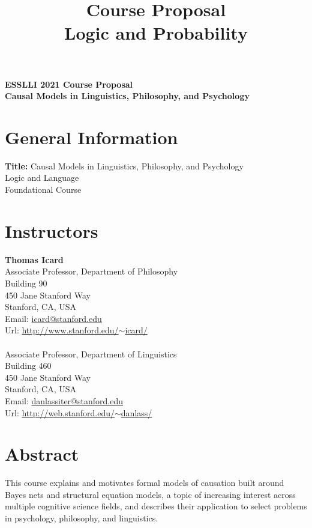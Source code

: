 \documentclass[english]{article}
\begin{document}
\title{\Large{ Course Proposal} \\ \Large{\bf Logic and Probability}}
\author{}
\date{}

\noindent \Large{\bf ESSLLI 2021 Course Proposal} \\ \large{\bf Causal Models in Linguistics, Philosophy, and Psychology} 

\section*{\large{General Information}}

\normalsize{{\bf Title:} Causal Models in Linguistics, Philosophy, and Psychology \\
 Logic and Language \\
 Foundational Course}

\section*{\large{Instructors}}

\normalsize{ {\bf Thomas Icard}\\
Associate Professor, Department of Philosophy \\
Building 90 \\
450 Jane Stanford Way \\
Stanford, CA, USA \\
Email: \href{icard@stanford.edu}{icard@stanford.edu}\\
Url: \href{http://www.stanford.edu/~icard/}{http://www.stanford.edu/$\sim$icard/} \\

\\
Associate Professor, Department of Linguistics \\
Building 460 \\
450 Jane Stanford Way \\
Stanford, CA, USA \\
Email: \href{danlassiter@stanford.edu}{danlassiter@stanford.edu}\\
Url: \href{http://web.stanford.edu/~danlass/}{http://web.stanford.edu/$\sim$danlass/}}

\section*{\large{Abstract}}

This course explains and motivates formal models of causation built around Bayes nets and structural equation models, a topic of increasing interest across multiple cognitive science fields, and describes their application to select problems in psychology, philosophy, and linguistics. 
\end{document}
